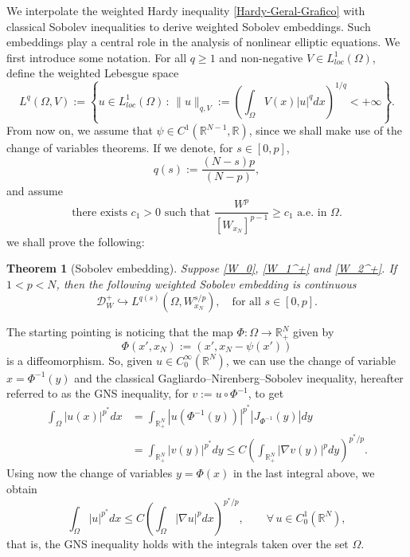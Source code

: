 \documentclass[12pt]{amsart}
\newtheorem{theorem}{Theorem}[section]
\theoremstyle{definition}
\theoremstyle{plain}
\newcommand{\dint}{\int_{\Omega}}
\begin{document}
We interpolate the weighted Hardy inequality \eqref{Hardy-Geral-Grafico} with classical Sobolev inequalities to derive weighted Sobolev embeddings. Such embeddings play a central role in the analysis of nonlinear elliptic equations. We first introduce some notation. For all $q \geq 1$ and non-negative $V \in L^1_{loc}(\Omega)$, define the weighted Lebesgue space 
	$$
		L^q(\Omega,V) := \left\{ u \in L^1_{loc}(\Omega)\,:\, \|u\|_{q,V} := 
        \left( \dint V(x)|u|^q dx \right)^{1/q} < +\infty \right\}.
	$$
From now on, we assume that $\psi \in C^1(\mathbb{R}^{N-1}, \mathbb{R})$, since we shall make use of the change of variables theorems.   If we denote, for $s \in [0,p]$, 
$$
q(s) := \frac{(N-s)p}{(N-p)}, 
$$
and assume
   \begin{equation} \label{W_2^+} \tag{$W_2^+$}
     \text{there exists } c_1>0 \text{ such that } \frac{W^p}{[W_{x_N}]^{p-1}} 
     \geq c_1 \text { a.e. in } \Omega.
    \end{equation} 
we shall prove the following:
    \begin{theorem}[Sobolev embedding]\label{Sobolev} 
Suppose \eqref{W_0}, \eqref{W_1^+} and   \eqref{W_2^+}. If $1<p<N$, then the following 
weighted Sobolev embedding is continuous
  $$
  \mathcal{D}_W^+ \hookrightarrow L^{q(s)}(\Omega,W^{s/p}_{x_N}),  \quad 
  \text{for all } s\in [0,p].
  $$
	\end{theorem}
 	
The 
starting pointing is noticing  that the map $\Phi:\Omega \to \mathbb{R}^N_+$ given by  
    $$
    \Phi(x',x_N) := (x',x_N-\psi(x'))
    $$
    is a diffeomorphism. So, given $u \in C_0^\infty(\mathbb{R}^N)$, we can use the change 
    of variable $x=\Phi^{-1}(y)$  and 
    the classical Gagliardo–Nirenberg–Sobolev inequality, hereafter referred to 
    as the GNS inequality,
     for $v:= u \circ \Phi^{-1}$, to get
    \begin{align*}
   \dint |u(x)|^{p^*} dx &= \int_{\mathbb{R}^N_+} |u(\Phi^{-1}(y))|^{p^*} 
   \left| J_{\Phi^{-1}}(y)\right| dy \\ & = \int_{\mathbb{R}^N_+} |v(y)|^{p^*} dy 
   \leq C \left( \int_{\mathbb{R}^N_+} |\nabla v(y)|^p dy \right)^{p^*/p}.
\end{align*}
    Using now the change of variables $y=\Phi(x)$ in the last integral above, we obtain
  \begin{equation}\label{GNS-Grafico}
    \dint |u|^{p^*} dx \leq C \left( \dint |\nabla u|^p dx \right)^{p^*/p}, \qquad 
    \forall\,u \in C_0^1(\mathbb{R}^N),
    \end{equation}
    that is, the GNS inequality holds with the integrals taken over the set $\Omega$.\\
\end{document}
